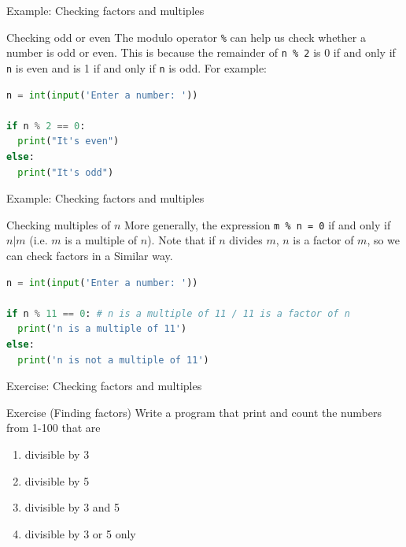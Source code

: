 \documentclass[10pt,xcolor={table,dvipsnames},t]{beamer}
\begin{document}
\begin{frame}[fragile]{Example: Checking factors and multiples}
  \begin{exampleblock}{Checking odd or even}
    The modulo operator \texttt{\%} can help us check whether a number is odd or even. This is because the remainder of \texttt{n \% 2} is 0 if and only if \texttt{n} is even and is 1 if and only if \texttt{n} is odd. For example:
\begin{lstlisting}[language=python]
n = int(input('Enter a number: '))

if n % 2 == 0:
  print("It's even")
else:
  print("It's odd")
\end{lstlisting}
  \end{exampleblock}
\end{frame}

\begin{frame}[fragile]{Example: Checking factors and multiples}
  \begin{exampleblock}{Checking multiples of $n$}
    More generally, the expression \texttt{m \% n = 0} if and only if $n|m$ (i.e. $m$ is a multiple of $n$). Note that if $n$ divides $m$, $n$ is a factor of $m$, so we can check factors in a Similar way.
\begin{lstlisting}[language=python]
n = int(input('Enter a number: '))

if n % 11 == 0: # n is a multiple of 11 / 11 is a factor of n
  print('n is a multiple of 11')
else:
  print('n is not a multiple of 11')
\end{lstlisting}
  \end{exampleblock}
\end{frame}

\begin{frame}{Exercise: Checking factors and multiples}
  \begin{exampleblock}{Exercise (Finding factors)}
    Write a program that print and count the numbers from 1-100 that are 
    \begin{enumerate}
      \item divisible by 3
      \item divisible by 5
      \item divisible by 3 and 5
      \item divisible by 3 or 5 only
    \end{enumerate}
  \end{exampleblock}
\end{frame}
\end{document}
